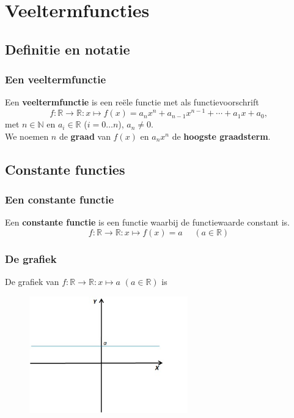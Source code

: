 \section{Veeltermfuncties}
\frame{\tableofcontents[currentsection]}

\subsection{Definitie en notatie}


\begin{frame}
\frametitle{Een veeltermfunctie}
\pause
\begin{definitie}
Een {\bfseries veeltermfunctie} is een re\"ele functie met als functievoorschrift
\[f:\mathbb{R}\rightarrow \mathbb{R}:x\mapsto f(x) = a_n x^n+a_{n-1}x^{n-1}+ \cdots + a_1 x + a_0,\]
met $n\in \mathbb{N}$ en $a_i \in \mathbb{R}$ ($i=0\ldots n$), $a_n\neq 0$.\\
We noemen $n$ de {\bfseries graad} van $f(x)$ en $a_nx^n$ de {\bfseries hoogste graadsterm}.
\end{definitie}
\end{frame}


\subsection{Constante functies}
\begin{frame}
\frametitle{Een constante functie}
\pause
\begin{definitie}
Een {\bfseries constante functie} is een functie waarbij de functiewaarde constant is.
\[ f:\mathbb{R} \rightarrow \mathbb{R} :x\mapsto f(x)=a ~~~~~~ (a \in \mathbb{R})\]
\end{definitie}
\end{frame}

\begin{frame}
\frametitle{ De grafiek}
De grafiek van  $f:\mathbb{R}\rightarrow \mathbb{R}:x\mapsto a$ $(a \in \mathbb{R})$ is 
\begin{figure}[htb]
\begin{center}
\includegraphics[width=2.7in]{figuren/constantefnct.jpg}
\end{center}
\end{figure}
\end{frame}

